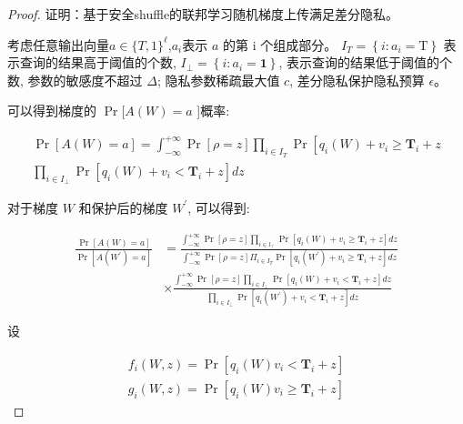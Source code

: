 \begin{proof}
证明：基于安全shuffle的联邦学习随机梯度上传满足差分隐私。

考虑任意输出向量$a \in\{T, 1\}^{\ell}$,$a_{i}$表示 $a$ 的第 $\mathrm{i}$ 个组成部分。 $I_{T}=\left\{i: a_{i}=\mathrm{T}\right\}$ 表示查询的结果高于阈值的个数, $I_{\perp}=\left\{i: a_{i}=\mathbf{1}\right\}$, 表示查询的结果低于阈值的个数, 参数的敏感度不超过 $\Delta$; 隐私参数稀疏最大值 $c$, 差分隐私保护隐私预算 $\epsilon$。

可以得到梯度的 $\operatorname{Pr}[A(W)=a$ ]概率:

\begin{equation}
\begin{array}{l}
\operatorname{Pr}[A(W)=a]=\int_{-\infty}^{+\infty} \operatorname{Pr}[\rho=z] \prod_{i \in I_{T}} \operatorname{Pr}\left[q_{i}(W)+v_{i} \geq \boldsymbol{T}_{i}+z\right. \\
\prod_{i \in I_{\perp}} \operatorname{Pr}\left[q_{i}(W)+v_{i}<\boldsymbol{T}_{i}+z\right] d z
\end{array}
\end{equation}

对于梯度 $W$ 和保护后的梯度 $W^{\prime}$, 可以得到:

\begin{equation}
\begin{aligned}
\frac{\operatorname{Pr}[A(W)=a]}{\operatorname{Pr}\left[A\left(W^{\prime}\right)=a\right]} &=\frac{\int_{-\infty}^{+\infty} \operatorname{Pr}[\rho=z] \prod_{i \in l_{\top}} \operatorname{Pr}\left[q_{i}(W)+v_{i} \geq \boldsymbol{T}_{i}+z\right] d z}{\int_{-\infty}^{+\infty} \operatorname{Pr}[\rho=z] \Pi_{i \in I_{T}} \operatorname{Pr}\left[q_{i}\left(W^{\prime}\right)+v_{i} \geq \boldsymbol{T}_{i}+z\right] d z} \\
& \times \frac{\int_{-\infty}^{+\infty} \operatorname{Pr}[\rho=z] \prod_{i \in I_{\perp}} \operatorname{Pr}\left[q_{i}(W)+v_{i}<\boldsymbol{T}_{i}+z\right] d z}{\prod_{i \in I_{\perp}} \operatorname{Pr}\left[q_{i}\left(W^{\prime}\right)+v_{i}<\boldsymbol{T}_{i}+z\right] d z}
\end{aligned}
\end{equation}

设

\begin{equation}
\begin{array}{l}
f_{i}(W, z)=\operatorname{Pr}\left[q_{i}(W) v_{i}<\boldsymbol{T}_{i}+z\right] \\
g_{i}(W, z)=\operatorname{Pr}\left[q_{i}(W) v_{i} \geq \boldsymbol{T}_{i}+z\right]
\end{array}
\end{equation}


\end{proof}
